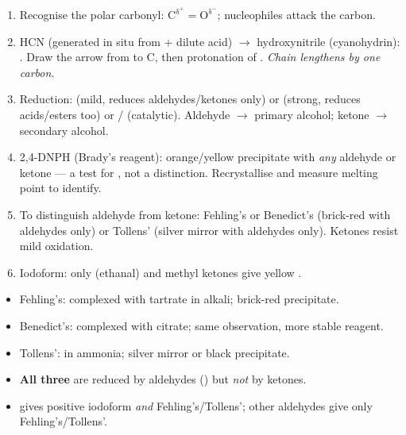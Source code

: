 \documentclass[11pt]{article}
\newcommand{\cle}[1]{{\popxbold\color{popdark}#1}}
\begin{document}
\begin{methode}
\begin{enumerate}
\item Recognise the \cle{polar carbonyl}: \ensuremath{\mathrm{C^{\delta^{+}}=O^{\delta^{-}}}}; nucleophiles attack the carbon.
\item \cle{HCN} (generated in situ from  + dilute acid) $\rightarrow$ hydroxynitrile (cyanohydrin): . Draw the arrow from  to C, then protonation of . \emph{Chain lengthens by one carbon.}
\item \cle{Reduction}:  (mild, reduces aldehydes/ketones only) or  (strong, reduces acids/esters too) or / (catalytic). Aldehyde $\rightarrow$ primary alcohol; ketone $\rightarrow$ secondary alcohol.
\item \cle{2,4-DNPH} (Brady's reagent): orange/yellow precipitate with \emph{any} aldehyde or ketone --- a test for , not a distinction. Recrystallise and measure melting point to identify.
\item To \cle{distinguish aldehyde from ketone}: Fehling's or Benedict's (brick-red  with aldehydes only) or Tollens' (silver mirror with aldehydes only). Ketones resist mild oxidation.
\item \cle{Iodoform}: only  (ethanal) and methyl ketones  give yellow .
\end{enumerate}
\end{methode}

\begin{attention}
\begin{itemize}
\item Fehling's:  complexed with tartrate in alkali; brick-red  precipitate.
\item Benedict's:  complexed with citrate; same observation, more stable reagent.
\item Tollens': \ce{[Ag(NH3)2]+} in ammonia; silver mirror or black  precipitate.
\item \textbf{All three} are reduced by aldehydes () but \emph{not} by ketones.
\item {} gives positive iodoform \emph{and} Fehling's/Tollens'; other aldehydes give only Fehling's/Tollens'.
\end{itemize}
\end{attention}
\end{document}
